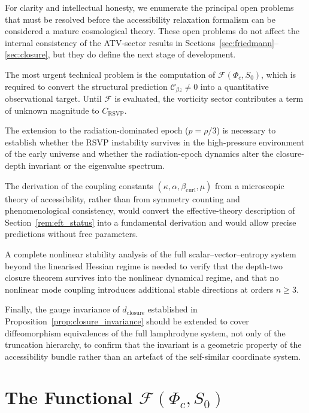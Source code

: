 \documentclass[12pt,a4paper]{article}
\theoremstyle{plain}
\theoremstyle{definition}
\theoremstyle{remark}
\newcommand{\Phic}{\Phi_c}
\newcommand{\dclos}{d_{\mathrm{closure}}}
\newcommand{\Cbz}{\mathcal{C}_{\beta z}}
\newcommand{\bcurl}{\beta_{\mathrm{curl}}}
\begin{document}
For clarity and intellectual honesty, we enumerate the principal open problems
that must be resolved before the accessibility relaxation formalism can be
considered a mature cosmological theory. These open problems do not affect the
internal consistency of the ATV-sector results in
Sections~\ref{sec:friedmann}--\ref{sec:closure}, but they do define the next
stage of development.

The most urgent technical problem is the computation of
$\mathcal{F}(\Phic,S_0)$, which is required to convert the structural prediction
$\Cbz\neq 0$ into a quantitative observational target. Until $\mathcal{F}$ is
evaluated, the vorticity sector contributes a term of unknown magnitude to
$C_{\mathrm{RSVP}}$.

The extension to the radiation-dominated epoch ($p = \rho/3$) is necessary to
establish whether the RSVP instability survives in the high-pressure environment
of the early universe and whether the radiation-epoch dynamics alter the
closure-depth invariant or the eigenvalue spectrum.

The derivation of the coupling constants $(\kappa, \alpha, \bcurl, \mu)$ from
a microscopic theory of accessibility, rather than from symmetry counting and
phenomenological consistency, would convert the effective-theory description of
Section~\ref{rem:eft_status} into a fundamental derivation and would allow
precise predictions without free parameters.

A complete nonlinear stability analysis of the full scalar--vector--entropy system
beyond the linearised Hessian regime is needed to verify that the depth-two
closure theorem survives into the nonlinear dynamical regime, and that no
nonlinear mode coupling introduces additional stable directions at orders $n\geq 3$.

Finally, the gauge invariance of $\dclos$ established in
Proposition~\ref{prop:closure_invariance} should be extended to cover
diffeomorphism equivalences of the full lamphrodyne system, not only of
the truncation hierarchy, to confirm that the invariant is a geometric
property of the accessibility bundle rather than an artefact of the
self-similar coordinate system.

\appendix

\section{The Functional $\mathcal{F}(\Phi_c,S_0)$}
\label{app:F_functional}
\end{document}
